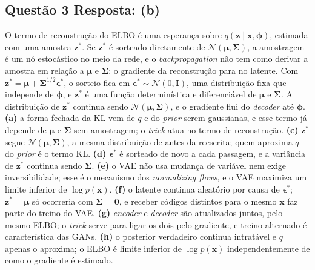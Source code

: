 \documentclass[11pt,a4paper]{article}
\begin{document}
\subsection*{Questão 3 \textemdash{} Resposta: (b)}
O termo de reconstrução do ELBO é uma esperança sobre $q(\mathbf{z}\mid\mathbf{x},\boldsymbol{\phi})$, estimada com uma amostra $\mathbf{z}^{*}$. Se $\mathbf{z}^{*}$ é sorteado diretamente de $\mathcal{N}(\boldsymbol{\mu}, \boldsymbol{\Sigma})$, a amostragem é um nó estocástico no meio da rede, e o \textit{backpropagation} não tem como derivar a amostra em relação a $\boldsymbol{\mu}$ e $\boldsymbol{\Sigma}$: o gradiente da reconstrução para no latente. Com $\mathbf{z}^{*} = \boldsymbol{\mu} + \boldsymbol{\Sigma}^{1/2}\boldsymbol{\epsilon}^{*}$, o sorteio fica em $\boldsymbol{\epsilon}^{*} \sim \mathcal{N}(0, \mathbf{I})$, uma distribuição fixa que independe de $\boldsymbol{\phi}$, e $\mathbf{z}^{*}$ é uma função determinística e diferenciável de $\boldsymbol{\mu}$ e $\boldsymbol{\Sigma}$. A distribuição de $\mathbf{z}^{*}$ continua sendo $\mathcal{N}(\boldsymbol{\mu}, \boldsymbol{\Sigma})$, e o gradiente flui do \textit{decoder} até $\boldsymbol{\phi}$.\\
\textbf{(a)} a forma fechada da KL vem de $q$ e do \textit{prior} serem gaussianas, e esse termo já depende de $\boldsymbol{\mu}$ e $\boldsymbol{\Sigma}$ sem amostragem; o \textit{trick} atua no termo de reconstrução.
\textbf{(c)} $\mathbf{z}^{*}$ segue $\mathcal{N}(\boldsymbol{\mu}, \boldsymbol{\Sigma})$, a mesma distribuição de antes da reescrita; quem aproxima $q$ do \textit{prior} é o termo KL.
\textbf{(d)} $\boldsymbol{\epsilon}^{*}$ é sorteado de novo a cada passagem, e a variância de $\mathbf{z}^{*}$ continua sendo $\boldsymbol{\Sigma}$.
\textbf{(e)} o VAE não usa mudança de variável nem exige inversibilidade; esse é o mecanismo dos \textit{normalizing flows}, e o VAE maximiza um limite inferior de $\log p(\mathbf{x})$.
\textbf{(f)} o latente continua aleatório por causa de $\boldsymbol{\epsilon}^{*}$; $\mathbf{z}^{*} = \boldsymbol{\mu}$ só ocorreria com $\boldsymbol{\Sigma} = \mathbf{0}$, e receber códigos distintos para o mesmo $\mathbf{x}$ faz parte do treino do VAE.
\textbf{(g)} \textit{encoder} e \textit{decoder} são atualizados juntos, pelo mesmo ELBO; o \textit{trick} serve para ligar os dois pelo gradiente, e treino alternado é característica das GANs.
\textbf{(h)} o posterior verdadeiro continua intratável e $q$ apenas o aproxima; o ELBO é limite inferior de $\log p(\mathbf{x})$ independentemente de como o gradiente é estimado.
\end{document}
